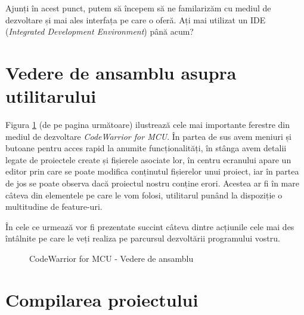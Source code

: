 Ajunți în acest punct, putem să începem să ne familarizăm cu mediul de dezvoltare și mai ales interfața pe care o oferă. Ați mai utilizat un IDE (\textit{Integrated Development Environment}) până acum?

\section{Vedere de ansamblu asupra utilitarului}

Figura \ref{fig:CodeWarrior-VedereDeAnsamblu} (de pe pagina următoare) ilustrează cele mai importante ferestre din mediul de dezvoltare \textit{CodeWarrior for MCU}. În partea de sus avem meniuri și butoane pentru acces rapid la anumite funcționalități, în stânga avem detalii legate de proiectele create și fișierele asociate lor, în centru ecranului apare un editor prin care se poate modifica conținutul fișierelor unui proiect, iar în partea de jos se poate observa dacă proiectul nostru conține erori. Acestea ar fi în mare câteva din elementele pe care le vom folosi, utilitarul punând la dispoziție o multitudine de feature-uri.

În cele ce urmează vor fi prezentate succint câteva dintre acțiunile cele mai des întâlnite pe care le veți realiza pe parcursul dezvoltării programului vostru.

\begin{figure}[h!]
    \vspace{-15pt}
    \vspace{-20pt}
    \caption{\label{fig:CodeWarrior-VedereDeAnsamblu} CodeWarrior for MCU - Vedere de ansamblu}
    \vspace{-10pt}
\end{figure}

\section{Compilarea proiectului}

